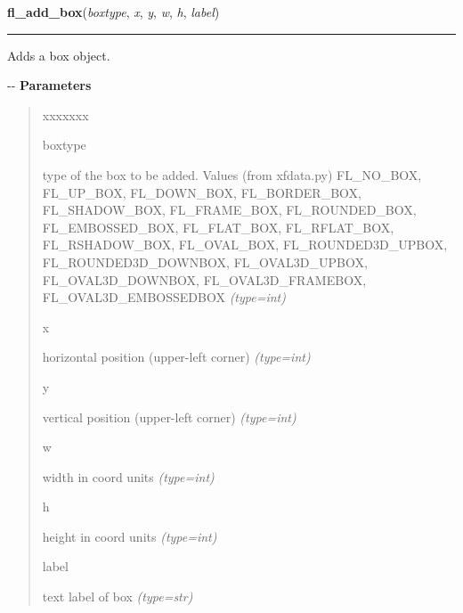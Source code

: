     \vspace{0.5ex}

\hspace{.8\funcindent}\begin{boxedminipage}{\funcwidth}

    \raggedright \textbf{fl\_add\_box}(\textit{boxtype}, \textit{x}, \textit{y}, \textit{w}, \textit{h}, \textit{label})

    \vspace{-1.5ex}

    \rule{\textwidth}{0.5\fboxrule}
\setlength{\parskip}{2ex}

Adds a box object.

-{}-
\setlength{\parskip}{1ex}
      \textbf{Parameters}
      \vspace{-1ex}

      \begin{quote}
        \begin{Ventry}{xxxxxxx}

          \item[boxtype]


type of the box to be added. Values (from xfdata.py) FL\_NO\_BOX,
FL\_UP\_BOX, FL\_DOWN\_BOX, FL\_BORDER\_BOX, FL\_SHADOW\_BOX, FL\_FRAME\_BOX,
FL\_ROUNDED\_BOX, FL\_EMBOSSED\_BOX, FL\_FLAT\_BOX, FL\_RFLAT\_BOX,
FL\_RSHADOW\_BOX, FL\_OVAL\_BOX, FL\_ROUNDED3D\_UPBOX, FL\_ROUNDED3D\_DOWNBOX,
FL\_OVAL3D\_UPBOX, FL\_OVAL3D\_DOWNBOX, FL\_OVAL3D\_FRAMEBOX,
FL\_OVAL3D\_EMBOSSEDBOX
            {\it (type=int)}

          \item[x]


horizontal position (upper-left corner)
            {\it (type=int)}

          \item[y]


vertical position (upper-left corner)
            {\it (type=int)}

          \item[w]


width in coord units
            {\it (type=int)}

          \item[h]


height in coord units
            {\it (type=int)}

          \item[label]


text label of box
            {\it (type=str)}

        \end{Ventry}


\end{quote}
\end{boxedminipage}
